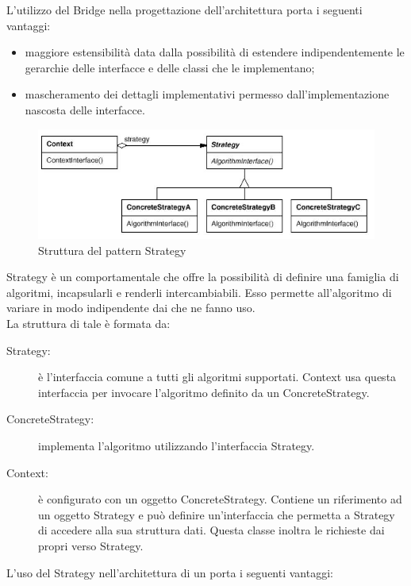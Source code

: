 		L’utilizzo del  Bridge nella progettazione dell’architettura porta i seguenti vantaggi:
		\begin{itemize}
			\item maggiore estensibilità data dalla possibilità di estendere indipendentemente le gerarchie delle interfacce e delle classi che le implementano;
			\item mascheramento dei dettagli implementativi permesso dall'implementazione nascosta delle interfacce.
		\end{itemize}

	 \label{app:strategy}
	\begin{figure}[H]\centering
    \includegraphics[scale=0.4]{SpecificaTecnica/Pics/Strategy}
    \caption{Struttura del pattern Strategy}
	\end{figure}
	Strategy è un  comportamentale che offre la possibilità di definire una famiglia di algoritmi, incapsularli e renderli intercambiabili. Esso permette all'algoritmo di variare in modo indipendente dai  che ne fanno uso. \\
	La struttura di tale  è formata da:
	\begin{description}
		\item[Strategy:] è l'interfaccia comune a tutti gli algoritmi supportati. Context usa questa interfaccia per invocare l'algoritmo definito da un ConcreteStrategy.
		\item[ConcreteStrategy:] implementa l'algoritmo utilizzando l'interfaccia Strategy.
		\item[Context:] è configurato con un oggetto ConcreteStrategy. Contiene un riferimento ad un oggetto Strategy e può definire un'interfaccia che permetta a Strategy di accedere alla sua struttura dati. Questa classe inoltra le richieste dai propri  verso Strategy.
	\end{description}
		L'uso del  Strategy nell'architettura di un   porta i seguenti vantaggi:
